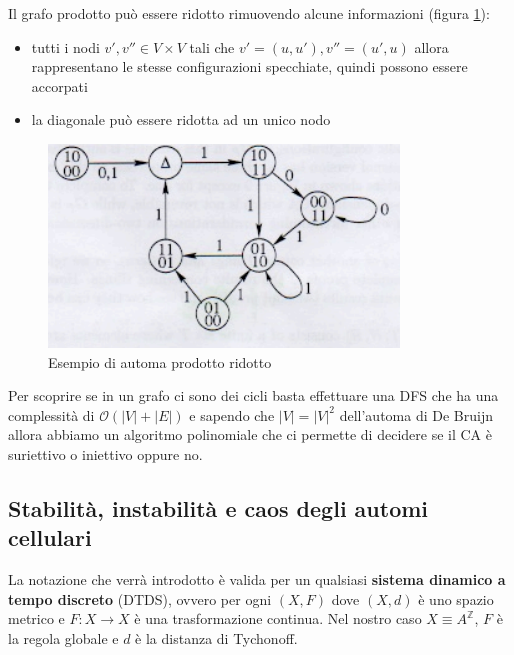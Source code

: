 Il grafo prodotto può essere ridotto rimuovendo alcune informazioni (figura \ref{fig:automa_prodotto_ridotto}):
\begin{itemize}
    \item tutti i nodi $v',v'' \in V\times V$ tali che $v'= (u,u'), v''=(u',u)$
          allora rappresentano le stesse configurazioni specchiate, quindi possono essere
          accorpati
    \item la diagonale può essere ridotta ad un unico nodo
\end{itemize}

\begin{figure}[!h]
    \centering
    \includegraphics[width=.7\textwidth]{img/sistemi_complessi/automa_prodotto_ridotto.png}
    \caption{Esempio di automa prodotto ridotto}
    \label{fig:automa_prodotto_ridotto}
\end{figure}

Per scoprire se in un grafo ci sono dei cicli basta effettuare una DFS che ha una
complessità di $\mathcal{O}(|V|+|E|)$ e sapendo che $|V|= |V|^2$ dell'automa di
De Bruijn allora abbiamo un algoritmo polinomiale che ci permette di decidere
se il CA è suriettivo o iniettivo oppure no.

\subsection{Stabilità, instabilità e caos degli automi cellulari}
La notazione che verrà introdotto è valida per un qualsiasi \textbf{sistema dinamico a tempo
    discreto} (DTDS), ovvero per ogni $(X,F)$ dove $(X,d)$ è uno spazio metrico e
$F:X\rightarrow X$ è una trasformazione continua. Nel nostro caso $X \equiv A^\mathbb{Z}$,
$F$ è la regola globale e $d$ è la distanza di Tychonoff.

